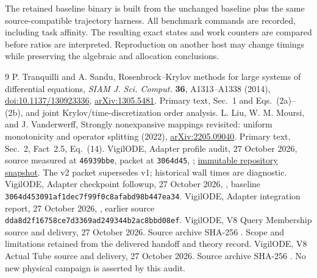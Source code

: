 \documentclass[aps,prd,reprint,amsmath,amssymb,longbibliography,nofootinbib]{revtex4-2}
\newcommand{\code}[1]{\texttt{#1}}
\newcommand{\baseline}{\code{3064d45}}
\begin{document}
The retained baseline binary is built from the unchanged baseline plus the same source-compatible trajectory harness. All benchmark commands are recorded, including task affinity. The resulting exact states and work counters are compared before ratios are interpreted. Reproduction on another host may change timings while preserving the algebraic and allocation conclusions.

\begin{thebibliography}{9}
 P. Tranquilli and A. Sandu, Rosenbrock--Krylov methods for large systems of differential equations, \emph{SIAM J. Sci. Comput.} \textbf{36}, A1313--A1338 (2014), \href{https://doi.org/10.1137/130923336}{doi:10.1137/130923336}, \href{https://arxiv.org/abs/1305.5481}{arXiv:1305.5481}. Primary text, Sec.~1 and Eqs.~(2a)--(2b), and joint Krylov/time-discretization order analysis.
 L. Liu, W. M. Moursi, and J. Vanderwerff, Strongly nonexpansive mappings revisited: uniform monotonicity and operator splitting (2022), \href{https://arxiv.org/abs/2205.09040}{arXiv:2205.09040}. Primary text, Sec.~2, Fact~2.5, Eq.~(14).
 VigilODE, Adapter profile audit, 27 October 2026, source measured at \code{46939bbe}, packet at \baseline, ; \href{https://github.com/cosmosapjw-quantum/vigilode/tree/3064d453091af1dec7f99f0c8afabd98b447ea34/external_reports/adapter_profile_audit_20261027}{immutable repository snapshot}. The v2 packet supersedes v1; historical wall times are diagnostic.
 VigilODE, Adapter checkpoint followup, 27 October 2026, , baseline \code{3064d453091af1dec7f99f0c8afabd98b447ea34}.
 VigilODE, Adapter integration report, 27 October 2026, , earlier source \code{dda8d2f16758ce7d3369ad249344b2ac8bbd08ef}.
 VigilODE, V8 Query Membership source and delivery, 27 October 2026. Source archive SHA-256 . Scope and limitations retained from the delivered handoff and theory record.
 VigilODE, V8 Actual Tube source and delivery, 27 October 2026. Source archive SHA-256 . No new physical campaign is asserted by this audit.
\end{thebibliography}
\end{document}
